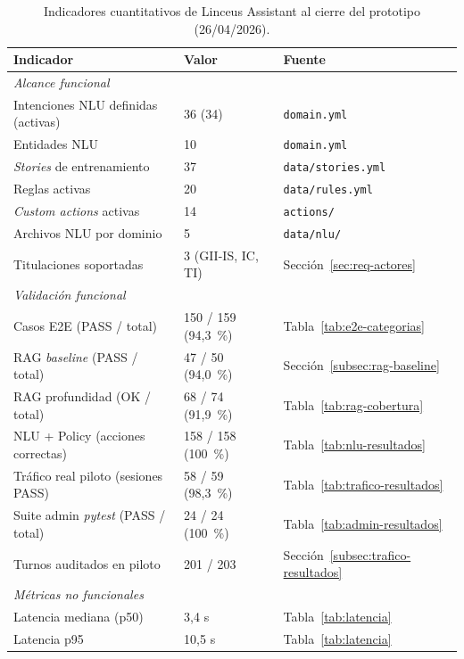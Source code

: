 \begin{table}[hbtp]
\centering
\small
\caption{Indicadores cuantitativos de Linceus Assistant al cierre del prototipo (26/04/2026).}\label{tab:linceus-numeros}
\begin{tabular}{|p{5.4cm}|p{2.0cm}|p{4.6cm}|}
\hline
\textbf{Indicador} & \textbf{Valor} & \textbf{Fuente} \\ \hline
\multicolumn{3}{|l|}{\textit{Alcance funcional}} \\ \hline
Intenciones NLU definidas (activas) & 36 (34) & \texttt{domain.yml} \\ \hline
Entidades NLU & 10 & \texttt{domain.yml} \\ \hline
\textit{Stories} de entrenamiento & 37 & \texttt{data/stories.yml} \\ \hline
Reglas activas & 20 & \texttt{data/rules.yml} \\ \hline
\textit{Custom actions} activas & 14 & \texttt{actions/} \\ \hline
Archivos NLU por dominio & 5 & \texttt{data/nlu/} \\ \hline
Titulaciones soportadas & 3 (GII-IS, IC, TI) & Sección~\ref{sec:req-actores} \\ \hline
\multicolumn{3}{|l|}{\textit{Validación funcional}} \\ \hline
Casos E2E (PASS / total) & 150 / 159 (94,3~\%) & Tabla~\ref{tab:e2e-categorias} \\ \hline
RAG \textit{baseline} (PASS / total) & 47 / 50 (94,0~\%) & Sección~\ref{subsec:rag-baseline} \\ \hline
RAG profundidad (OK / total) & 68 / 74 (91,9~\%) & Tabla~\ref{tab:rag-cobertura} \\ \hline
NLU + Policy (acciones correctas) & 158 / 158 (100~\%) & Tabla~\ref{tab:nlu-resultados} \\ \hline
Tráfico real piloto (sesiones PASS) & 58 / 59 (98,3~\%) & Tabla~\ref{tab:trafico-resultados} \\ \hline
Suite admin \textit{pytest} (PASS / total) & 24 / 24 (100~\%) & Tabla~\ref{tab:admin-resultados} \\ \hline
Turnos auditados en piloto & 201 / 203 & Sección~\ref{subsec:trafico-resultados} \\ \hline
\multicolumn{3}{|l|}{\textit{Métricas no funcionales}} \\ \hline
Latencia mediana (p50) & 3,4 s & Tabla~\ref{tab:latencia} \\ \hline
Latencia p95 & 10,5 s & Tabla~\ref{tab:latencia} \\ \hline

\end{tabular}
\end{table}
